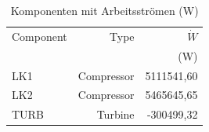 \begin{longtable}{lrr}
\caption{Komponenten mit Arbeitsströmen (W)} \\
\hline
Component & Type & $\dot W$ \\
 &  & (W) \\
\hline
LK1 & Compressor & 5111541,60 \\
LK2 & Compressor & 5465645,65 \\
TURB & Turbine & -300499,32 \\
\hline
\end{longtable}
